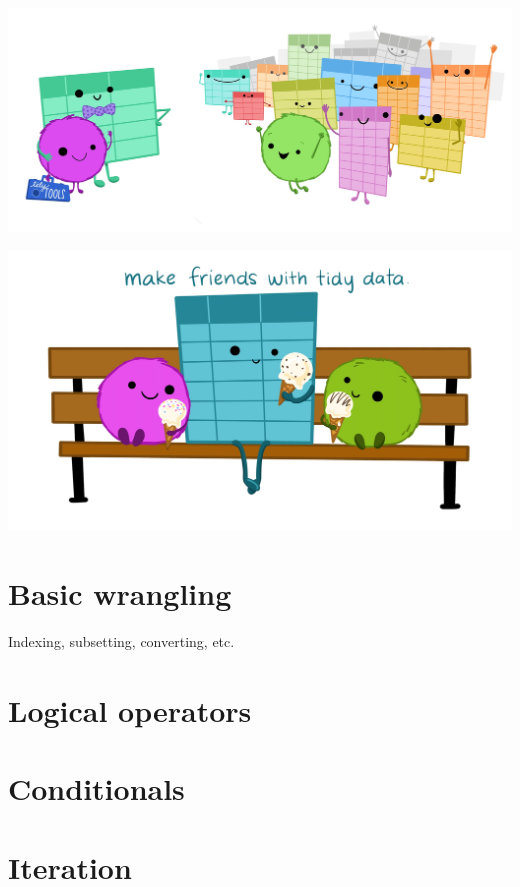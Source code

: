 \documentclass[
]{book}
\begin{document}
\includegraphics{images/tidydata_6.jpg}

\includegraphics{images/tidydata_7.jpg}

\hypertarget{basic-wrangling}{%
\chapter{Basic wrangling}\label{basic-wrangling}}

Indexing, subsetting, converting, etc.

\hypertarget{logicals}{%
\chapter{Logical operators}\label{logicals}}

\hypertarget{conditionals}{%
\chapter{Conditionals}\label{conditionals}}

\hypertarget{iteration}{%
\chapter{Iteration}\label{iteration}}
\end{document}
